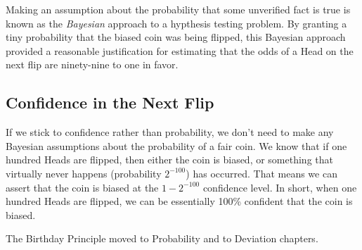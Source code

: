 Making an assumption about the probability that some unverified fact
is true is known as the \emph{Bayesian} approach to a hypthesis
testing problem.  By granting a tiny probability that the biased coin
was being flipped, this Bayesian approach provided a reasonable
justification for estimating that the odds of a Head on the next flip
are ninety-nine to one in favor.

\subsection{Confidence in the Next Flip}

If we stick to confidence rather than probability, we don't need to
make any Bayesian assumptions about the probability of a fair coin.
We know that if one hundred Heads are flipped, then either the coin is
biased, or something that virtually never happens (probability
$2^{-100}$) has occurred.  That means we can assert that the coin is
biased at the $1-2^{-100}$ confidence level.  In short, when one
hundred Heads are flipped, we can be essentially 100\% confident that
the coin is biased.

\begin{problems}

\practiceproblems
{}
\end{problems}

\begin{editingnotes}
The Birthday Principle %
moved to Probability and to Deviation chapters.
\end{editingnotes}


\endinput


